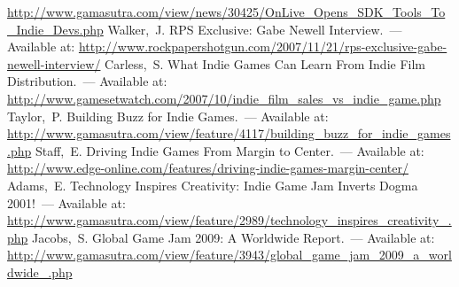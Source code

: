 \begin{thebibliography}{10}
        \url{http://www.gamasutra.com/view/news/30425/OnLive_Opens_SDK_Tools_To_Indie_Devs.php}
     Walker,~J. RPS Exclusive: Gabe Newell Interview.~--- Available at: 
        \url{http://www.rockpapershotgun.com/2007/11/21/rps-exclusive-gabe-newell-interview/}
     Carless,~S. What Indie Games Can Learn From Indie Film Distribution.~--- Available at: 
        \url{http://www.gamesetwatch.com/2007/10/indie_film_sales_vs_indie_game.php}
     Taylor,~P. Building Buzz for Indie Games.~--- Available at: 
        \url{http://www.gamasutra.com/view/feature/4117/building_buzz_for_indie_games.php}
     Staff,~E. Driving Indie Games From Margin to Center.~--- Available at: 
        \url{http://www.edge-online.com/features/driving-indie-games-margin-center/}
     Adams,~E. Technology Inspires Creativity: Indie Game Jam Inverts Dogma 2001!~--- 
        Available at: \url{http://www.gamasutra.com/view/feature/2989/technology_inspires_creativity_.php}
     Jacobs,~S. Global Game Jam 2009: A Worldwide Report.~--- Available at: 
        \url{http://www.gamasutra.com/view/feature/3943/global_game_jam_2009_a_worldwide_.php}
\end{thebibliography}
